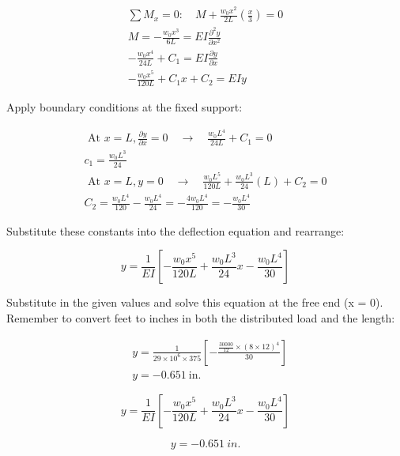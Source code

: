 \documentclass[
  letterpaper,
  DIV=11,
  numbers=noendperiod]{scrreprt}
\begin{document}
\begin{tcolorbox}
\begin{tcolorbox}
\[
\begin{gathered} \sum M_x=0: \quad M+\frac{w_0 x^2}{2 L}\left(\frac{x}{3}\right)=0 \\ M=-\frac{w_0 x^3}{6 L}=E I \frac{\partial^2 y}{\partial x^2} \\ -\frac{w_0 x^4}{24 L}+C_1=E I \frac{\partial y}{\partial x} \\ -\frac{w_0 x^5}{120 L}+C_1 x+C_2=EIy\end{gathered}
\]

Apply boundary conditions at the fixed support:

\[
\begin{gathered} \text { At } x=L, \frac{\partial y}{\partial x}=0 \quad \rightarrow \quad \frac{w_0 L^4}{24 L}+C_1=0
\\ c_1=\frac{w_0 L^3}{24}
\\ \text { At } x=L, y=0 \quad \rightarrow \quad \frac{w_0 L^5}{120 L}+\frac{w_0 L^3}{24}(L)+C_2=0
\\ C_2=\frac{w_0 L^4}{120}-\frac{w_0 L^4}{24}=-\frac{4 w_0 L^4}{120}=-\frac{w_0 L^4}{30} \end{gathered}
\]

Substitute these constants into the deflection equation and rearrange:

\[
y=\frac{1}{E I}\left[-\frac{w_0 x^5}{120L}+\frac{w_0 L^3}{24} x-\frac{w_0 L^4}{30}\right]
\]

Substitute in the given values and solve this equation at the free end
(x = 0). Remember to convert feet to inches in both the distributed load
and the length:

\[
\begin{aligned} & y=\frac{1}{29 \times 10^6 \times 375} \left[-\frac{\frac{30000}{12} \times (8\times12)^4}{30}\right] \\ & y=- 0.651 \mathrm{~in.}\end{aligned}
\]

\end{tcolorbox}

\begin{tcolorbox}[enhanced jigsaw, colbacktitle=quarto-callout-note-color!10!white, title={Answer only}, coltitle=black, leftrule=.75mm, rightrule=.15mm, opacityback=0, breakable, colframe=quarto-callout-note-color-frame, left=2mm, arc=.35mm, colback=white, bottomrule=.15mm, bottomtitle=1mm, toptitle=1mm, titlerule=0mm, opacitybacktitle=0.6, toprule=.15mm]

\[
y=\frac{1}{E I}\left[-\frac{w_0 x^5}{120L}+\frac{w_0 L^3}{24} x-\frac{w_0 L^4}{30}\right]
\]

\[
y=-0.651~in.
\]

\end{tcolorbox}

\end{tcolorbox}
\end{document}
